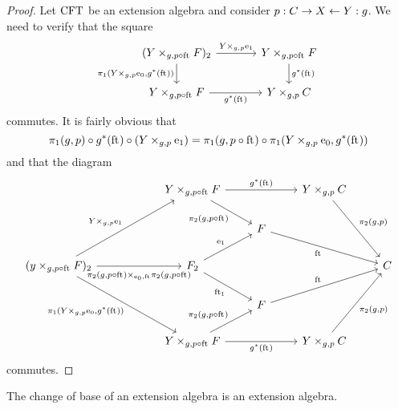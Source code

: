 \begin{proof}
Let $\mathrm{CFT}$ be an extension algebra and consider $p:C\rightarrow X\leftarrow Y:g$.
We need to verify that the square
\begin{equation*}
\begin{tikzcd}[column sep=large]
(\pullback{Y}{\stesysf}{g}{p\circ\eft})_2
  \ar{r}{\cobesys{Y}{\efamext}{g}{p}} 
  \ar{d}[swap]{\pullbackpr{1}{\cobesys{Y}{\ectxext}{g}{p}}{g^\ast(\eft)}} 
  & 
\pullback{Y}{\stesysf}{g}{p\circ\eft}
  \ar{d}{g^\ast(\eft)}
  \\
\pullback{Y}{\stesysf}{g}{p\circ\eft}
  \ar{r}[swap]{g^\ast(\eft)} 
  & 
\pullback{Y}{\stesysc}{g}{p}
\end{tikzcd}
\end{equation*}
commutes. It is fairly obvious that
\begin{equation*}
\pullbackpr{1}{g}{p}\circ g^\ast(\eft)\circ (\cobesys{Y}{\efamext}{g}{p})
  =
\pullbackpr{1}{g}{p\circ\eft}\circ \pullbackpr{1}{\cobesys{Y}{\ectxext}{g}{p}}{g^\ast(\eft)}
\end{equation*}
and that the diagram
\begin{equation*}
\begin{tikzcd}
  {}&
  {}&
\pullback{Y}{\stesysf}{g}{p\circ\eft}
  \ar{rr}{g^\ast(\eft)}
  \ar{dr}[swap]{\pullbackpr{2}{g}{p\circ\eft}}
  &
  {}&
\pullback{Y}{\stesysc}{g}{p}
  \ar{ddr}{\pullbackpr{2}{g}{p}}
  \\
  {}&
  {}&
  {}&
\stesysf
  \ar{drr}[swap]{\eft}
  \\
(\pullback{y}{\stesysf}{g}{p\circ\eft})_2
  \ar{uurr}{\cobesys{Y}{\efamext}{g}{p}}
  \ar{rr}[swap,yshift=-.5ex]{\pullback{\pullbackpr{2}{g}{p\circ\eft}}{\pullbackpr{2}{g}{p\circ\eft}}{\ectxext}{\eft}}
  \ar{ddrr}[swap]{\pullbackpr{1}{\cobesys{Y}{\ectxext}{g}{p}}{g^\ast(\eft)}}
  &
  {}&
\stesysf_2
  \ar{ur}{\efamext}
  \ar{dr}[swap]{\eft[1]}
  &
  {}&
  {}&
\stesysc
  \\
  {}&
  {}&
  {}&
\stesysf
  \ar{urr}{\eft}
  \\
  {}&
  {}&
\pullback{Y}{\stesysf}{g}{p\circ\eft}
  \ar{rr}[swap]{g^\ast(\eft)}
  \ar{ur}{\pullbackpr{2}{g}{p\circ\eft}}
  &
  {}&
\pullback{Y}{\stesysc}{g}{p}
  \ar{uur}[swap]{\pullbackpr{2}{g}{p}}
\end{tikzcd}
\end{equation*}
commutes.
\end{proof}

\begin{thm}
The change of base of an extension algebra is an extension algebra.
\end{thm}

